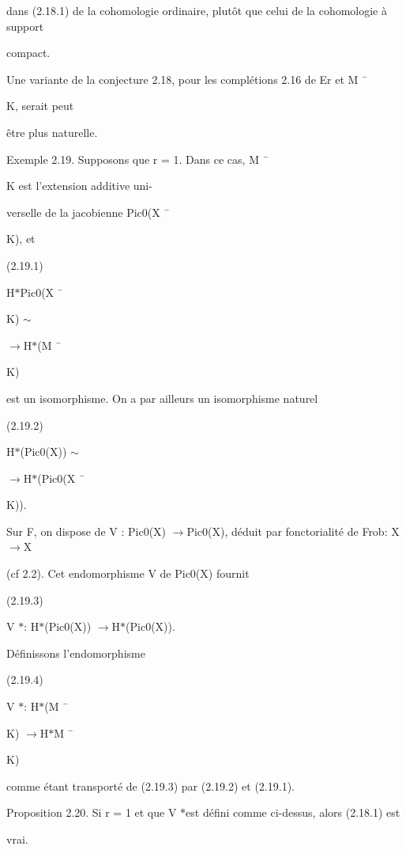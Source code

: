 \documentclass[11pt]{article}
\begin{document}
\noindent dans (2.18.1) de la cohomologie ordinaire, plutôt que celui de la cohomologie à support\par
\noindent compact.\par
\noindent Une variante de la conjecture 2.18, pour les complétions 2.16 de Er et M ¯\par
\noindent K, serait peut\par
\noindent être plus naturelle.\par
\noindent Exemple 2.19. Supposons que r = 1. Dans ce cas, M ¯\par
\noindent K est l’extension additive uni-\par
\noindent verselle de la jacobienne Pic0(X ¯\par
\noindent K), et\par
\noindent (2.19.1)\par
\noindent H\(*\)Pic0(X ¯\par
\noindent K) \(\sim\)\par
\noindent \(\to\)H\(*\)(M ¯\par
\noindent K)\par
\noindent est un isomorphisme. On a par ailleurs un isomorphisme naturel\par
\noindent (2.19.2)\par
\noindent H\(*\)(Pic0(X)) \(\sim\)\par
\noindent \(\to\)H\(*\)(Pic0(X ¯\par
\noindent K)).\par
\noindent Sur F, on dispose de V : Pic0(X) \(\to\)Pic0(X), déduit par fonctorialité de Frob: X \(\to\)X\par
\noindent (cf 2.2). Cet endomorphisme V de Pic0(X) fournit\par
\noindent (2.19.3)\par
\noindent V \(*\): H\(*\)(Pic0(X)) \(\to\)H\(*\)(Pic0(X)).\par
\noindent Définissons l’endomorphisme\par
\noindent (2.19.4)\par
\noindent V \(*\): H\(*\)(M ¯\par
\noindent K) \(\to\)H\(*\)M ¯\par
\noindent K)\par
\noindent comme étant transporté de (2.19.3) par (2.19.2) et (2.19.1).\par
\noindent Proposition 2.20. Si r = 1 et que V \(*\)est défini comme ci-dessus, alors (2.18.1) est\par
\noindent vrai.\par
\end{document}
